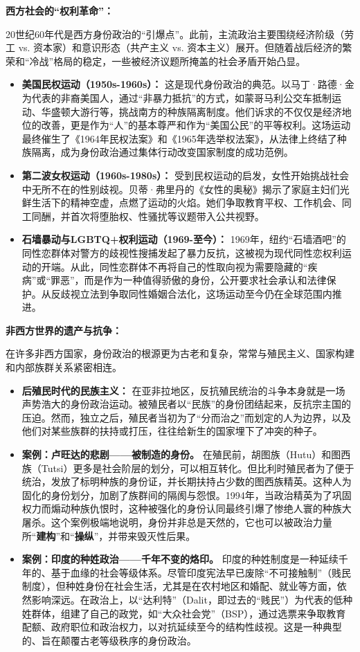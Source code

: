 \textbf{西方社会的“权利革命”：}

20世纪60年代是西方身份政治的“引爆点”。此前，主流政治主要围绕经济阶级（劳工 vs. 资本家）和意识形态（共产主义 vs. 资本主义）展开。但随着战后经济的繁荣和“冷战”格局的稳定，一些被经济议题所掩盖的社会矛盾开始凸显。
\begin{itemize}
    \item \textbf{美国民权运动（1950s-1960s）：} 这是现代身份政治的典范。以马丁·路德·金为代表的非裔美国人，通过“非暴力抵抗”的方式，如蒙哥马利公交车抵制运动、华盛顿大游行等，挑战南方的种族隔离制度。他们诉求的不仅仅是经济地位的改善，更是作为“人”的基本尊严和作为“美国公民”的平等权利。这场运动最终催生了《1964年民权法案》和《1965年选举权法案》，从法律上终结了种族隔离，成为身份政治通过集体行动改变国家制度的成功范例。
    \item \textbf{第二波女权运动（1960s-1980s）：} 受到民权运动的启发，女性开始挑战社会中无所不在的性别歧视。贝蒂·弗里丹的《女性的奥秘》揭示了家庭主妇们光鲜生活下的精神空虚，点燃了运动的火焰。她们争取教育平权、工作机会、同工同酬，并首次将堕胎权、性骚扰等议题带入公共视野。
    \item \textbf{石墙暴动与LGBTQ+权利运动（1969-至今）：} 1969年，纽约“石墙酒吧”的同性恋群体对警方的歧视性搜捕发起了暴力反抗，这被视为现代同性恋权利运动的开端。从此，同性恋群体不再将自己的性取向视为需要隐藏的“疾病”或“罪恶”，而是作为一种值得骄傲的身份，公开要求社会承认和法律保护。从反歧视立法到争取同性婚姻合法化，这场运动至今仍在全球范围内推进。
\end{itemize}

\textbf{非西方世界的遗产与抗争：}

在许多非西方国家，身份政治的根源更为古老和复杂，常常与殖民主义、国家构建和内部族群关系紧密相连。
\begin{itemize}
    \item \textbf{后殖民时代的民族主义：} 在亚非拉地区，反抗殖民统治的斗争本身就是一场声势浩大的身份政治运动。被殖民者以“民族”的身份团结起来，反抗宗主国的压迫。然而，独立之后，殖民者当初为了“分而治之”而划定的人为边界，以及他们对某些族群的扶持或打压，往往给新生的国家埋下了冲突的种子。
    \item \textbf{案例：卢旺达的悲剧——被制造的身份。} 在殖民前，胡图族（Hutu）和图西族（Tutsi）更多是社会阶层的划分，可以相互转化。但比利时殖民者为了便于统治，发放了标明种族的身份证，并长期扶持占少数的图西族精英。这种人为固化的身份划分，加剧了族群间的隔阂与怨恨。1994年，当政治精英为了巩固权力而煽动种族仇恨时，这种被强化的身份认同最终引爆了惨绝人寰的种族大屠杀。这个案例极端地说明，身份并非总是天然的，它也可以被政治力量所“\textbf{建构}”和“\textbf{操纵}”，并带来毁灭性后果。
    \item \textbf{案例：印度的种姓政治——千年不变的烙印。} 印度的种姓制度是一种延续千年的、基于血缘的社会等级体系。尽管印度宪法早已废除“不可接触制”（贱民制度），但种姓身份在社会生活，尤其是在农村地区和婚配、就业等方面，依然影响深远。在政治上，以“达利特”（Dalit，即过去的“贱民”）为代表的低种姓群体，组建了自己的政党，如“大众社会党”（BSP），通过选票来争取教育配额、政府职位和政治权力，以对抗延续至今的结构性歧视。这是一种典型的、旨在颠覆古老等级秩序的身份政治。
\end{itemize}

